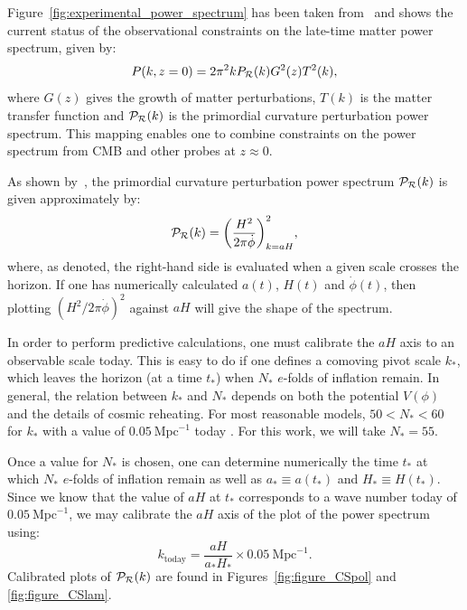 Figure~\ref{fig:experimental_power_spectrum} has been taken from~\cite{hlozek_atacama_2012} and shows the current status of the observational constraints on the late-time matter power spectrum, given by:
\begin{equation}
    P(k,z=0) = 2\pi^2 k P_\mathcal{R}(k) G^2(z) T^2(k),
\end{equation}
where \(G(z)\) gives the growth of matter perturbations, \(T(k)\) is the matter transfer function and \(\mathcal{P}_{\mathcal{R}}(k)\) is the primordial curvature perturbation power spectrum. This mapping enables one to combine constraints on the power spectrum from CMB and other probes at \(z\approx 0\).




As shown by~\cite{liddle_cosmological_2000}, the primordial curvature perturbation power spectrum \(\mathcal{P}_{\mathcal{R}}(k)\) is given approximately by:
\begin{equation}
  \mathcal{P}_{\mathcal{R}}(k)
  =
  {\left(\frac{H^2}{2\pi\dot{\phi}}\right)}^2_{k=a H},
  \label{eqn:curvature_power_spectrum}
\end{equation}
where, as denoted, the right-hand side is evaluated when a given scale crosses the horizon. If one has numerically calculated \(a(t)\), \(H(t)\) and \(\dot{\phi}(t)\), then plotting \({\left(H^2/ 2\pi\dot{\phi}\right)}^2\) against \(aH\) will give the shape of the spectrum.

In order to perform predictive calculations, one must calibrate the \(aH\) axis to an observable scale today. This is easy to do if one defines a comoving pivot scale \(k_*\), which leaves the horizon (at a time \(t_*\)) when \(N_*\) \(e\)-folds of inflation remain. In general, the relation between \(k_*\) and \(N_*\) depends on both the potential \(V(\phi)\) and the details of cosmic reheating. For most reasonable models, \(50<N_*<60\)  for \(k_*\) with a value of \(0.05\:\mathrm{Mpc}^{-1}\) today \citep{planck_collaboration_planck_2013-1}. For this work, we will take \(N_*=55\). 

Once a value for \(N_*\) is chosen, one can determine numerically the time \(t_*\) at which \(N_*\) \(e\)-folds of inflation remain as well as \(a_*\equiv a(t_*)\) and \(H_*\equiv H(t_*)\). Since we know that the value of \(aH\) at \(t_*\) corresponds to a wave number today of \(0.05\:\mathrm{Mpc}^{-1}\), we may calibrate the \(aH\) axis of the plot of the power spectrum using:
\begin{equation}
  k_\mathrm{today} 
  = 
  \frac{aH}{a_*H_*}\times0.05\:\mathrm{Mpc}^{-1}.
\end{equation}
Calibrated plots of \(\mathcal{P}_{\mathcal{R}}(k)\) are found in Figures~\ref{fig:figure_CSpol} and \nolinebreak\ref{fig:figure_CSlam}. 


